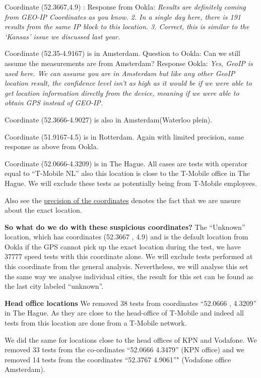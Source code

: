 \documentclass[]{article}
\begin{document}
Coordinate (52.3667,4.9) : Response from Ookla: \emph{Results are
definitely coming from GEO-IP Coordinates as you know. 2. In a single
day here, there is 191 results from the same IP block to this location.
3. Correct, this is similar to the `Kansas' issue we discussed last
year.}

Coordinate (52.35-4.9167) is in Amsterdam. Question to Ookla: Can we
still assume the measurements are from Amsterdam? Response Ookla:
\emph{Yes, GeoIP is used here. We can assume you are in Amsterdam but
like any other GeoIP location result, the confidence level isn't as high
as it would be if we were able to get location information directly from
the device, meaning if we were able to obtain GPS instead of GEO-IP.}

Coordinate (52.3666-4.9027) is also in Amsterdam(Waterloo plein).

Coordinate (51.9167-4.5) is in Rotterdam. Again with limited precision,
same response as above from Ookla.

Coordinate (52.0666-4.3209) is in The Hague. All cases are tests with
operator equal to ``T-Mobile NL'' also this location is close to the
T-Mobile office in The Hague. We will exclude these tests as potentially
being from T-Mobile employees.

Also see the
\href{https://en.wikipedia.org/wiki/Decimal_degrees}{precision of the
coordinates} denotes the fact that we are unsure about the exact
location.

\textbf{So what do we do with these suspicious coordinates?} The
``Unknown'' location, which has coordinates (52.3667 , 4.9) and is the
default location from Ookla if the GPS cannot pick up the exact location
during the test, we have 37777 speed tests with this coordinate alone.
We will exclude tests performed at this coordinate from the general
analysis. Nevertheless, we will analyse this set the same way we analyse
individual cities, the result for this set can be found as the last city
labeled ``unknown''.

\textbf{Head office locations} We removed 38 tests from coordinates
``52.0666 , 4.3209'' in The Hague. As they are close to the head-office
of T-Mobile and indeed all tests from this location are done from a
T-Mobile network.

We did the same for locations close to the head offices of KPN and
Vodafone. We removed 33 tests from the co-ordinates ``52.0666 4.3479''
(KPN office) and we removed 14 tests from the coordinates ``52.3767
4.9061''" (Vodafone office Amsterdam).
\end{document}
